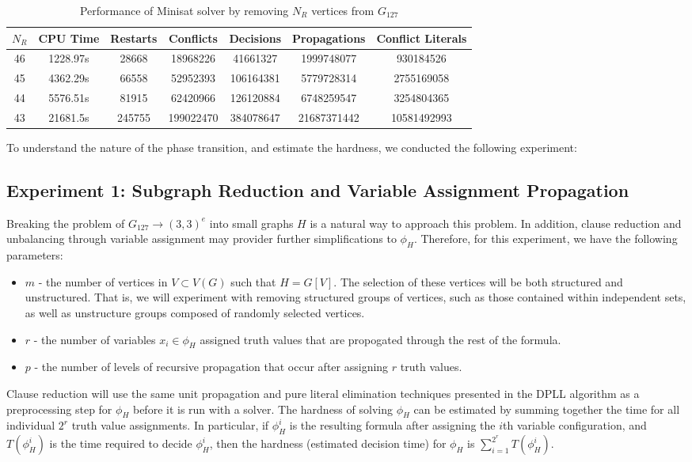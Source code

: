 \documentclass[paper=a4, fontsize=11pt]{scrartcl} %
\begin{document}
\begin{table}
	\caption{Performance of Minisat solver by removing $N_R$ vertices from $G_{127}$}
	\begin{tabular}{c | c | c | c | c | c | c}
		\hline
		$N_R$ & CPU Time & Restarts & Conflicts & Decisions & Propagations & Conflict Literals \\ \hline
		46 & 1228.97s & 28668 & 18968226 & 41661327 & 1999748077 & 930184526 \\ 
		45 & 4362.29s & 66558 & 52952393 & 106164381 & 5779728314 & 2755169058 \\ 
		44 & 5576.51s & 81915 & 62420966 & 126120884 & 6748259547 & 3254804365 \\ 
		43 & 21681.5s & 245755 & 199022470 & 384078647 & 21687371442 & 10581492993 \\ 
		\hline
	\end{tabular}
	\label{tab:performanceSat}
\end{table}

To understand the nature of the phase transition, and estimate the hardness, we conducted 
the following experiment:

\subsection{Experiment 1: Subgraph Reduction and Variable Assignment Propagation}
Breaking the problem of $G_{127} \to (3,3)^e$ into small graphs $H$ is a natural way
to approach this problem. In addition, clause reduction and unbalancing through
variable assignment may provider further simplifications to $\phi_H$.
Therefore, for this experiment, we have the following parameters:
\begin{itemize}
	\item $m$ - the number of vertices in $V \subset V(G)$ such that $H = G[V]$. The selection of
	these vertices will be both structured and unstructured. That is, we will experiment
	with removing structured groups of vertices, such as those contained within independent 
	sets, as well as unstructure groups composed of randomly selected vertices.
	\item $r$ - the number of variables $x_i \in \phi_H$ assigned truth values that are
	propogated through the rest of the formula. 
	\item $p$ - the number of levels of recursive propagation that occur after assigning 
	$r$ truth values.
\end{itemize}
Clause reduction will use the same unit propagation and pure literal elimination techniques
presented in the DPLL algorithm as a preprocessing step for $\phi_H$ before it is run with a solver.
The hardness of solving $\phi_H$ can be estimated by summing together the time for
all individual $2^r$ truth value assignments. In particular, if $\phi_H^i$ is the
resulting formula after assigning the $i$th variable configuration, and $T(\phi_H^i)$ 
is the time required to decide $\phi_H^i$, then the hardness (estimated decision time)
for $\phi_H$ is $\sum_{i = 1}^{2^r} T(\phi_H^i)$.
\end{document}
